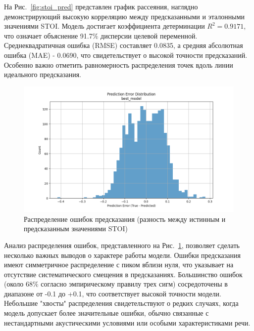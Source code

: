 \documentclass[oneside, final, 14pt]{extarticle}
\begin{document}
На Рис.~\ref{fig:stoi_pred} представлен график рассеяния, наглядно демонстрирующий высокую корреляцию между предсказанными и эталонными значениями STOI. Модель достигает коэффициента детерминации $R^2 = 0.9171$, что означает объяснение 91.7\% дисперсии целевой переменной. Среднеквадратичная ошибка (RMSE) составляет 0.0835, а средняя абсолютная ошибка (MAE) - 0.0690, что свидетельствует о высокой точности предсказаний. Особенно важно отметить равномерность распределения точек вдоль линии идеального предсказания.

\begin{figure}[]
\centering
\includegraphics[width=1\linewidth]{best_model_error_dist.png}
\caption{Распределение ошибок предсказания (разность между истинным и предсказанным значениями STOI)}
\label{fig:error_dist}
\end{figure}

Анализ распределения ошибок, представленного на Рис.~\ref{fig:error_dist}, позволяет сделать несколько важных выводов о характере работы модели. Ошибки предсказания имеют симметричное распределение с пиком вблизи нуля, что указывает на отсутствие систематического смещения в предсказаниях. Большинство ошибок (около 68\% согласно эмпирическому правилу трех сигм) сосредоточены в диапазоне от -0.1 до +0.1, что соответствует высокой точности модели. Небольшие "хвосты" распределения свидетельствуют о редких случаях, когда модель допускает более значительные ошибки, обычно связанные с нестандартными акустическими условиями или особыми характеристиками речи.
\end{document}
